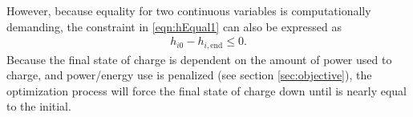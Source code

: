 However, because equality for two continuous variables is computationally demanding, the constraint in \eqref{eqn:hEqual1} can also be expressed as 
\begin{equation} \begin{aligned}
	h_{i0} - h_{i,\text{end}} \le 0.
\end{aligned} \end{equation}
Because the final state of charge is dependent on the amount of power used to charge, and power/energy use is penalized (see section \ref{sec:objective}), the optimization process will force the final state of charge down until is nearly equal to the initial.
